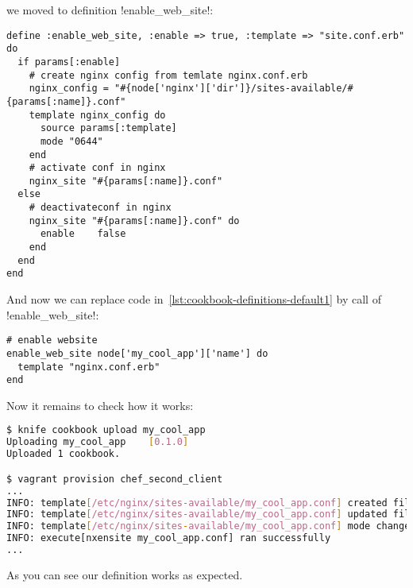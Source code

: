 we moved to definition \inline!enable_web_site!:

\begin{lstlisting}[label=lst:cookbook-definitions-enable-site,title=my-server-cloud/site-cookbooks/my\_cool\_app/definitions/enable\_web\_site.rb]
define :enable_web_site, :enable => true, :template => "site.conf.erb" do
  if params[:enable]
    # create nginx config from temlate nginx.conf.erb
    nginx_config = "#{node['nginx']['dir']}/sites-available/#{params[:name]}.conf"
    template nginx_config do
      source params[:template]
      mode "0644"
    end
    # activate conf in nginx
    nginx_site "#{params[:name]}.conf"
  else
    # deactivateconf in nginx
    nginx_site "#{params[:name]}.conf" do
      enable    false
    end
  end
end
\end{lstlisting}

And now we can replace code in~\ref{lst:cookbook-definitions-default1} by call of \inline!enable_web_site!:

\begin{lstlisting}[label=lst:cookbook-definitions-default2,title=my-server-cloud/site-cookbooks/my\_cool\_app/recipes/default.rb]
# enable website
enable_web_site node['my_cool_app']['name'] do
  template "nginx.conf.erb"
end
\end{lstlisting}

Now it remains to check how it works:

\begin{lstlisting}[language=Bash,label=lst:cookbook-definitions-shell1]
$ knife cookbook upload my_cool_app
Uploading my_cool_app    [0.1.0]
Uploaded 1 cookbook.

$ vagrant provision chef_second_client
...
INFO: template[/etc/nginx/sites-available/my_cool_app.conf] created file /etc/nginx/sites-available/my_cool_app.conf
INFO: template[/etc/nginx/sites-available/my_cool_app.conf] updated file contents /etc/nginx/sites-available/my_cool_app.conf
INFO: template[/etc/nginx/sites-available/my_cool_app.conf] mode changed to 644
INFO: execute[nxensite my_cool_app.conf] ran successfully
...
\end{lstlisting}

As you can see our definition works as expected.
